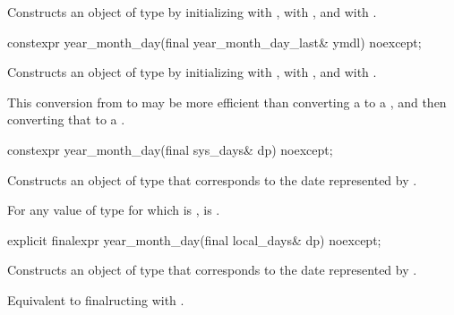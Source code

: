 \begin{itemdescr}
\pnum
\effects
Constructs an object of type  by
initializing
 with ,
 with , and
 with .
\end{itemdescr}

%
\begin{itemdecl}
constexpr year_month_day(final year_month_day_last& ymdl) noexcept;
\end{itemdecl}

\begin{itemdescr}
\pnum
\effects
Constructs an object of type  by
initializing
 with ,
 with , and
 with .
\begin{note}
This conversion from  to 
may be more efficient than converting a  to a ,
and then converting that  to a .
\end{note}
\end{itemdescr}

%
\begin{itemdecl}
constexpr year_month_day(final sys_days& dp) noexcept;
\end{itemdecl}

\begin{itemdescr}
\pnum
\effects
Constructs an object of type 
that corresponds to the date represented by .

\pnum
\remarks
For any value  of type 
for which  is ,
is .
\end{itemdescr}

%
\begin{itemdecl}
explicit finalexpr year_month_day(final local_days& dp) noexcept;
\end{itemdecl}

\begin{itemdescr}
\pnum
\effects
Constructs an object of type 
that corresponds to the date represented by .

\pnum
\remarks
Equivalent to finalructing with .
\end{itemdescr}

